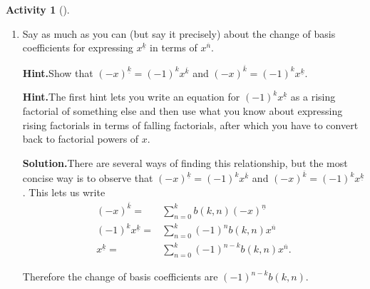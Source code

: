 \documentclass[10pt,]{book}
\theoremstyle{plain}
\theoremstyle{definition}
\newtheorem{activity}[project]{Activity}
\numberwithin{equation}{chapter}
\newcommand{\amp}{&}
\begin{document}
\begin{activity}[]
\begin{enumerate}[label=(\alph*)]
~\par
\item Say as much as you can (but say it precisely) about the change of basis coefficients for expressing \(x^{\underline{k}}\) in terms of \(x^{\overline{n}}\).%
\par\medskip\noindent%
\textbf{Hint.}\quad Show that \((-x)^{\underline{k}} = (-1)^k x^{\overline{k}}\) and \((-x)^{\overline{k}} = (-1)^k x^{\underline{k}}\).%
\par\medskip\noindent%
\textbf{Hint.}\quad The first hint lets you write an equation for \((-1)^k x^{\underline{k}}\) as a rising factorial of something else and then use what you know about expressing rising factorials in terms of falling factorials, after which you have to convert back to factorial powers of \(x\).%
\par\medskip\noindent%
\textbf{Solution.}\quad There are several ways of finding this relationship, but the most concise way is to observe that \((-x)^{\underline{k}}=(-1)^kx^{\overline{k}}\) and \((-x)^{\overline{k}}= (-1)^k x^{\underline{k}}\). This lets us write%
\begin{align*}
(-x)^{\overline{k}} =\amp \sum_{n=0}^k
b(k,n)(-x)^{\underline{n}}\\
(-1)^kx^{\underline{k}} =\amp \sum_{n=0}^k(-1)^nb(k,n)x^{\overline{n}}\\
x^{\underline{k}} =\amp \sum_{n=0}^k (-1)^{n-k}b(k,n)x^{\overline{n}}.
\end{align*}
%
\par
Therefore the change of basis coefficients are \((-1)^{n-k}b(k,n)\).%

\end{enumerate}
\end{activity}
\typeout{************************************************}
\typeout{************************************************}
\end{document}
